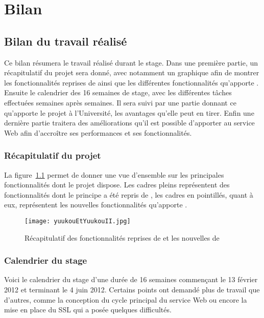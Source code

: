 \chapter{Bilan}

\section{Bilan du travail r\'ealis\'e}

Ce bilan r\'esumera le travail r\'ealis\'e durant le stage.
Dans une premi\`ere partie, un r\'ecapitulatif du projet sera donn\'e, avec notamment un graphique afin de montrer les fonctionnalit\'es reprises de {\Yuukou} ainsi que les diff\'erentes fonctionnalit\'es qu'apporte {\YuukouII}.
Ensuite le calendrier des 16 semaines de stage, avec les diff\'erentes t\^aches effectu\'ees semaines apr\`es semaines.
Il sera suivi par une partie donnant ce qu'apporte le projet \`a l'Universit\'e, les avantages qu'elle peut en tirer.
Enfin une derni\`ere partie traitera des am\'eliorations qu'il est possible d'apporter au service Web afin d'accro\^itre ses performances et ses fonctionnalit\'es.

\subsection{R\'ecapitulatif du projet}

La figure~\ref{figure:yuukouEtYuukouII} permet de donner une vue d'ensemble sur les principales fonctionnalit\'es dont le projet dispose.
Les cadres pleins repr\'esentent des fonctionnalit\'es dont le principe a \'et\'e repris de {\Yuukou}, les cadres en pointill\'es, quant \`a eux, repr\'esentent les nouvelles fonctionnalit\'es qu'apporte \YuukouII.

\clearpage

\begin{figure}[!ht]
	\centering
	\texttt{[image: yuukouEtYuukouII.jpg]}
	\caption{R\'ecapitulatif des fonctionnalit\'es reprises de {\Yuukou} et les nouvelles de \YuukouII}
	\label{figure:yuukouEtYuukouII}

\end{figure}

\subsection{Calendrier du stage}

Voici le calendrier du stage d'une dur\'ee de 16 semaines commen\c{c}ant le 13 f\'evrier 2012 et terminant le 4 juin 2012.
Certains points ont demand\'e plus de travail que d'autres, comme la conception du cycle principal du service Web ou encore la mise en place du SSL qui a pos\'ee quelques difficult\'es.

